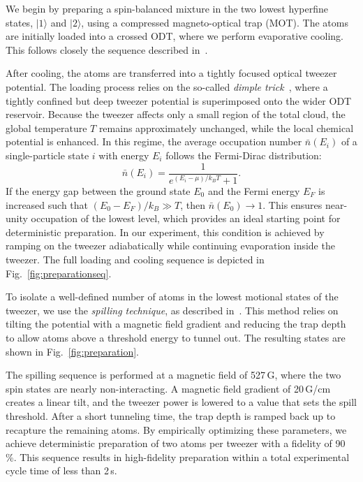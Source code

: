 

We begin by preparing a spin-balanced mixture in the two lowest hyperfine states, $|1\rangle$ and $|2\rangle$, using a compressed magneto-optical trap (MOT). The atoms are initially loaded into a crossed ODT, where we perform evaporative cooling. This follows closely the sequence described in~\cite{culemann_construction_2024}.

After cooling, the atoms are transferred into a tightly focused optical tweezer potential. The loading process relies on the so-called \emph{dimple trick}~\cite{zurn_few-fermion_2012}, where a tightly confined but deep tweezer potential is superimposed onto the wider ODT reservoir. Because the tweezer affects only a small region of the total cloud, the global temperature $T$ remains approximately unchanged, while the local chemical potential is enhanced. In this regime, the average occupation number $\bar{n}(E_i)$ of a single-particle state $i$ with energy $E_i$ follows the Fermi-Dirac distribution:
\begin{equation}
    \bar{n}(E_i) = \frac{1}{e^{(E_i - \mu)/k_B T} + 1}.
\end{equation}
If the energy gap between the ground state $E_0$ and the Fermi energy $E_F$ is increased such that $(E_0 - E_F) / k_B \gg T$, then $\bar{n}(E_0) \rightarrow 1$. This ensures near-unity occupation of the lowest level, which provides an ideal starting point for deterministic preparation. In our experiment, this condition is achieved by ramping on the tweezer adiabatically while continuing evaporation inside the tweezer. The full loading and cooling sequence is depicted in Fig.~\ref{fig:preparationseq}.

To isolate a well-defined number of atoms in the lowest motional states of the tweezer, we use the \emph{spilling technique}, as described in~\cite{zurn_few-fermion_2012, holten_pauli_2022}. This method relies on tilting the potential with a magnetic field gradient and reducing the trap depth to allow atoms above a threshold energy to tunnel out. 
The resulting states are shown in Fig.~\ref{fig:preparation}.

The spilling sequence is performed at a magnetic field of 527\,G, where the two spin states are nearly non-interacting. A magnetic field gradient of 20\,G/cm creates a linear tilt, and the tweezer power is lowered to a value that sets the spill threshold. After a short tunneling time, the trap depth is ramped back up to recapture the remaining atoms. By empirically optimizing these parameters, we achieve deterministic preparation of two atoms per tweezer with a fidelity of 90\,\%. This sequence results in high-fidelity preparation within a total experimental cycle time of less than 2\,s.



